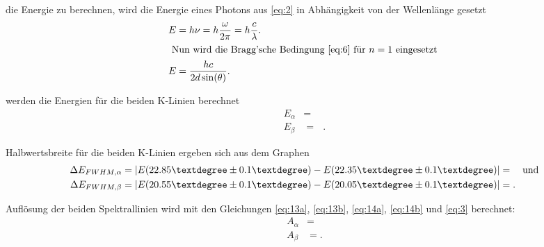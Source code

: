 \justifying die Energie zu berechnen, wird die Energie eines Photons 
aus \eqref{eq:2} in Abhängigkeit von der Wellenlänge gesetzt
\begin{align}
    E &= h \nu = h \frac{\omega}{2 \pi}=h \frac{c}{\lambda}. \label{eq:11}\\
    \intertext{
        Nun wird die Bragg'sche Bedingung \eqref{eq:6} für $n=1$ eingesetzt
    }
    E &= \frac{hc}{2d\sin(\theta)} \label{eq:12}.
\end{align}

\justifying werden die Energien für die beiden K-Linien berechnet
\begin{subequations}
\begin{align}
    E_{\alpha} &= \text{ }   \label{eq:13a} \\
    E_{\beta} &=   \text{ } \label{eq:13b} .
\end{align}
\end{subequations}

\justifying Halbwertsbreite für die beiden K-Linien ergeben sich aus dem Graphen
\begin{subequations}
\begin{align}
    \Delta E_{FWHM ,\alpha} &=\abs{E(22.85°\pm 0.1°)-E(22.35°\pm 0.1°)} = \text{} \label{eq:14a} \quad\text{und} \\
    \Delta E_{FWHM ,\beta} &= \abs{E(20.55°\pm 0.1°)-E(20.05°\pm 0.1°) }= \text{} \label{eq:14b}.
\end{align}
\end{subequations}

\justifying Auflösung der beiden Spektrallinien wird mit 
den Gleichungen \ref{eq:13a}, \ref{eq:13b}, \ref{eq:14a}, \ref{eq:14b} und \ref{eq:3}
berechnet:
\begin{subequations}
\begin{align}
    A_{\alpha}&= \text{} \label{eq:15a} \\
    A_{\beta}&=  \text{} \label{eq:15b}.
\end{align}
\end{subequations}

